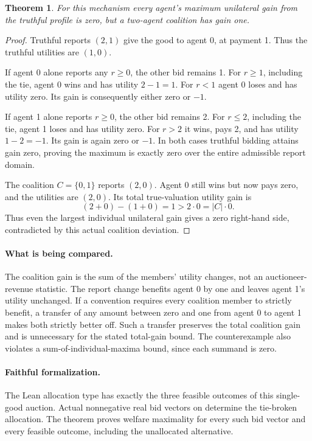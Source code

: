 \documentclass[11pt]{article}
\newtheorem{theorem}{Theorem}
\begin{document}
\begin{theorem}
For this mechanism every agent's maximum unilateral gain from the truthful profile is zero, but a two-agent coalition has gain one.
\end{theorem}
\begin{proof}
Truthful reports $(2,1)$ give the good to agent 0, at payment 1. Thus the truthful utilities are $(1,0)$.

If agent 0 alone reports any $r\ge0$, the other bid remains 1. For $r\ge1$, including the tie, agent 0 wins and has utility $2-1=1$. For $r<1$ agent 0 loses and has utility zero. Its gain is consequently either zero or $-1$.

If agent 1 alone reports $r\ge0$, the other bid remains 2. For $r\le2$, including the tie, agent 1 loses and has utility zero. For $r>2$ it wins, pays 2, and has utility $1-2=-1$. Its gain is again zero or $-1$. In both cases truthful bidding attains gain zero, proving the maximum is exactly zero over the entire admissible report domain.

The coalition $C=\{0,1\}$ reports $(2,0)$. Agent 0 still wins but now pays zero, and the utilities are $(2,0)$. Its total true-valuation utility gain is
\[
 (2+0)-(1+0)=1>2\cdot0=|C|\cdot0.
\]
Thus even the largest individual unilateral gain gives a zero right-hand side, contradicted by this actual coalition deviation.
\end{proof}

\newpage
\paragraph{What is being compared.}
The coalition gain is the sum of the members' utility changes, not an auctioneer-revenue statistic. The report change benefits agent 0 by one and leaves agent 1's utility unchanged. If a convention requires every coalition member to strictly benefit, a transfer of any amount between zero and one from agent 0 to agent 1 makes both strictly better off. Such a transfer preserves the total coalition gain and is unnecessary for the stated total-gain bound. The counterexample also violates a sum-of-individual-maxima bound, since each summand is zero.

\paragraph{Faithful formalization.}
The Lean allocation type has exactly the three feasible outcomes of this single-good auction. Actual nonnegative real bid vectors on  determine the tie-broken allocation. The theorem  proves welfare maximality for every such bid vector and every feasible outcome, including the unallocated alternative.
\end{document}
